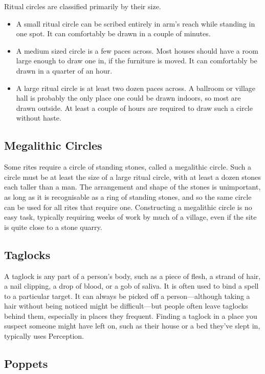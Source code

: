 Ritual circles are classified primarily by their size.
\begin{itemize}
	\item A small ritual circle can be scribed entirely in arm's reach while standing in one spot.
		It can comfortably be drawn in a couple of minutes.
	\item A medium sized circle is a few paces across.
		Most houses should have a room large enough to draw one in, if the furniture is moved.
		It can comfortably be drawn in a quarter of an hour.
	\item A large ritual circle is at least two dozen paces across.
		A ballroom or village hall is probably the only place one could be drawn indoors, so most are drawn outside.
		At least a couple of hours are required to draw such a circle without haste.
\end{itemize}

\subsection{Megalithic Circles}

Some rites require a circle of standing stones, called a megalithic circle.
Such a circle must be at least the size of a large ritual circle, with at least a dozen stones each taller than a man.
The arrangement and shape of the stones is unimportant, as long as it is recognisable as a ring of standing stones, and so the same circle can be used for all rites that require one.
Constructing a megalithic circle is no easy task, typically requiring weeks of work by much of a village, even if the site is quite close to a stone quarry.

\subsection{Taglocks}

A taglock is any part of a person's body, such as a piece of flesh, a strand of hair, a nail clipping, a drop of blood, or a gob of saliva.
It is often used to bind a spell to a particular target.
It can always be picked off a person---although taking a hair without being noticed might be difficult---but people often leave taglocks behind them, especially in places they frequent.
Finding a taglock in a place you suspect someone might have left on, such as their house or a bed they've slept in, typically uses Perception.

\subsection{Poppets}

